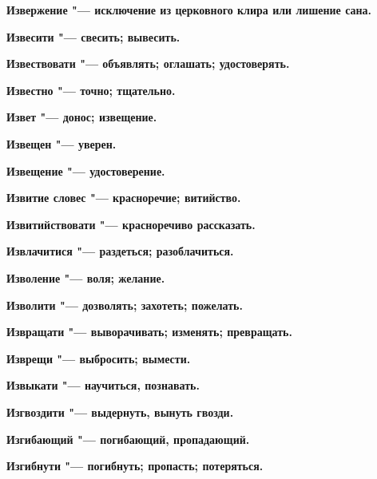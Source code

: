 \begin{mymulticols}{2}
\bfseries Извержение\normalfont{} "--- исключение из церковного клира или лишение сана. 




\bfseries Извесити\normalfont{} "--- свесить; вывесить. 




\bfseries Извествовати\normalfont{} "--- объявлять; оглашать; удостоверять. 




\bfseries Известно\normalfont{} "--- точно; тщательно. 




\bfseries Извет\normalfont{} "--- донос; извещение. 




\bfseries Извещен\normalfont{} "--- уверен. 




\bfseries Извещение\normalfont{} "--- удостоверение. 




\bfseries Извитие словес\normalfont{} "--- красноречие; витийство. 




\bfseries Извитийствовати\normalfont{} "--- красноречиво рассказать. 




\bfseries Извлачитися\normalfont{} "--- раздеться; разоблачиться. 




\bfseries Изволение\normalfont{} "--- воля; желание. 




\bfseries Изволити\normalfont{} "--- дозволять; захотеть; пожелать. 




\bfseries Извращати\normalfont{} "--- выворачивать; изменять; превращать. 




\bfseries Изврещи\normalfont{} "--- выбросить; вымести. 




\bfseries Извыкати\normalfont{} "--- научиться, познавать. 




\bfseries Изгвоздити\normalfont{} "--- выдернуть, вынуть гвозди. 




\bfseries Изгибающий\normalfont{} "--- погибающий, пропадающий. 




\bfseries Изгибнути\normalfont{} "--- погибнуть; пропасть; потеряться. 





\end{mymulticols}
